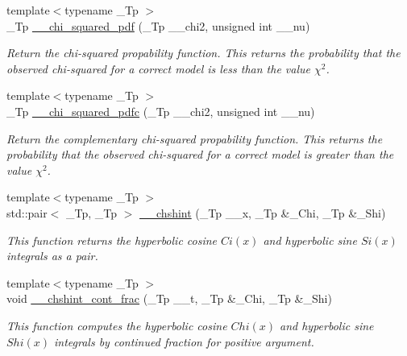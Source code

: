 \begin{DoxyCompactItemize}
\item 
{\footnotesize template$<$typename \+\_\+\+Tp $>$ }\\\+\_\+\+Tp \hyperlink{namespacestd_1_1____detail_a2125cbbc3fd3aad11c8025478c7a14fe}{\+\_\+\+\_\+chi\+\_\+squared\+\_\+pdf} (\+\_\+\+Tp \+\_\+\+\_\+chi2, unsigned int \+\_\+\+\_\+nu)
\begin{DoxyCompactList}\small\item\em Return the chi-\/squared propability function. This returns the probability that the observed chi-\/squared for a correct model is less than the value $ \chi^2 $. \end{DoxyCompactList}\item 
{\footnotesize template$<$typename \+\_\+\+Tp $>$ }\\\+\_\+\+Tp \hyperlink{namespacestd_1_1____detail_aa62c16dd75a7411400c7082e6b2b246b}{\+\_\+\+\_\+chi\+\_\+squared\+\_\+pdfc} (\+\_\+\+Tp \+\_\+\+\_\+chi2, unsigned int \+\_\+\+\_\+nu)
\begin{DoxyCompactList}\small\item\em Return the complementary chi-\/squared propability function. This returns the probability that the observed chi-\/squared for a correct model is greater than the value $ \chi^2 $. \end{DoxyCompactList}\item 
{\footnotesize template$<$typename \+\_\+\+Tp $>$ }\\std\+::pair$<$ \+\_\+\+Tp, \+\_\+\+Tp $>$ \hyperlink{namespacestd_1_1____detail_aa07abc4dac6cf589ccd12d3ce40277cf}{\+\_\+\+\_\+chshint} (\+\_\+\+Tp \+\_\+\+\_\+x, \+\_\+\+Tp \&\+\_\+\+Chi, \+\_\+\+Tp \&\+\_\+\+Shi)
\begin{DoxyCompactList}\small\item\em This function returns the hyperbolic cosine $ Ci(x) $ and hyperbolic sine $ Si(x) $ integrals as a pair. \end{DoxyCompactList}\item 
{\footnotesize template$<$typename \+\_\+\+Tp $>$ }\\void \hyperlink{namespacestd_1_1____detail_a07da2303d36d77bfad393a7b8ebdf686}{\+\_\+\+\_\+chshint\+\_\+cont\+\_\+frac} (\+\_\+\+Tp \+\_\+\+\_\+t, \+\_\+\+Tp \&\+\_\+\+Chi, \+\_\+\+Tp \&\+\_\+\+Shi)
\begin{DoxyCompactList}\small\item\em This function computes the hyperbolic cosine $ Chi(x) $ and hyperbolic sine $ Shi(x) $ integrals by continued fraction for positive argument. \end{DoxyCompactList}\item 

\end{DoxyCompactItemize}
